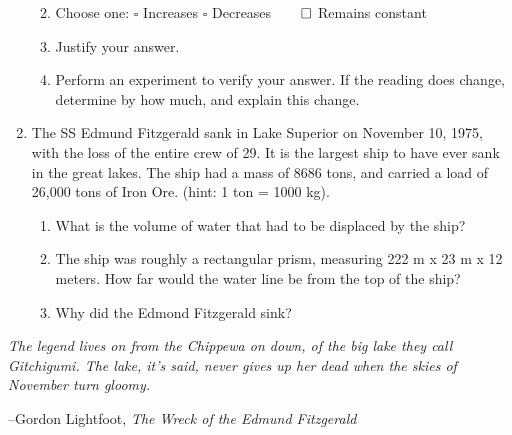 \documentclass[letterpaper, 11pt]{article}
\begin{document}
\begin{enumerate}
	\begin{enumerate} 
		\vspace{-.1in}
	 \item Choose one: \hspace{.25in}
	 $ \square $ Increases \hspace{.25in} $ \square $ Decreases $ \hspace{.25in} \square$ Remains constant
	 
	 \item Justify your answer.
	 \vspace{.4in}
	 \item Perform an experiment to verify your answer.  If the reading does change, determine by how much, and explain this change. 
	 \vspace{.45in}
	 
	  \end{enumerate}
  
	\item The SS Edmund Fitzgerald  sank in Lake Superior on November 10, 1975, with the loss of the entire crew of 29. It is the largest ship to have ever sank in the great lakes.  The ship had a mass of 8686 tons, and carried a load of 26,000 tons of Iron Ore.  (hint: 1 ton = 1000 kg). 
	\begin{enumerate}
		\item   What is the volume of water that had to be displaced by the ship?
		\vspace{.4in}
		\item The ship was roughly a rectangular prism, measuring 222 m x 23 m x 12 meters.  How far would the water line be from the top of the ship?
		\vspace{0.4in}
		\item Why did the Edmond Fitzgerald sink?
		\vspace{0,4in}
		
	\end{enumerate}
	 
	 

\end{enumerate}

 

 
 
 \begin{center}
 	
 	\textit{
 			 The legend lives on from the Chippewa on down, of the big lake they call Gitchigumi.
 		The lake, it's said, never gives up her dead when the skies of November turn gloomy.}
 		
 		--Gordon Lightfoot, \textit {The Wreck of the Edmund Fitzgerald}
 
 	  
 \end{center}

 
	
\end{document}
